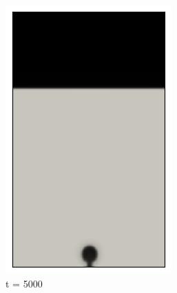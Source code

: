 \begin{figure}[H]
	\centering
	\begin{subfigure}{0.25\textwidth}
		\includegraphics[width=\linewidth]{figs/cap4/cuda_bb_760_d5}
		\caption{t = 5000}
		\label{fig:1}
	\end{subfigure}\hfil 
	\begin{subfigure}{0.25\textwidth}

\end{subfigure}
\end{figure}
